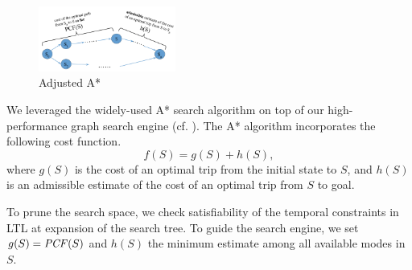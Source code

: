 \begin{figure}[!ht]
  \centering
    \includegraphics[width=0.4\textwidth]{figs/Astar.pdf}
  \caption{Adjusted A*\label{fig:astar}}
\end{figure}

We leveraged the widely-used A* search algorithm on top of our high-performance graph search
engine (cf. ).  The A* algorithm incorporates the following cost function.
\begin{equation}
	f(S) = g(S) + h(S),
\end{equation}
where $g(S)$ is the cost of an optimal trip from the initial state to $S$, and
$h(S)$ is an admissible estimate of the cost of an optimal trip from $S$ to goal.

To prune the search space, we check satisfiability of the temporal constraints in LTL
at expansion of the search tree.
To guide the search engine, we set $g(S)=\mathit{PCF}(S)$ and $h(S)$ the minimum estimate among
all available modes in $S$.
